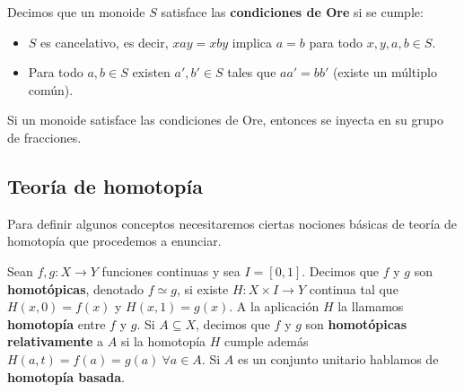 \documentclass[bibtex, anon]{TEMat-article}
\begin{document}
\begin{definicion}\label{condiciones}
	Decimos que un monoide $S$ satisface las \textbf{condiciones de Ore} \cite{Ore} si se cumple:
	\begin{itemize}
		\item $S$ es cancelativo, es decir, $xay=xby$ implica $a=b$ para todo $x,y,a,b\in S$. 
		\item Para todo $a,b\in S$ existen $a',b'\in S$ tales que $aa'=bb'$ (existe un múltiplo común). 
	\end{itemize}
\end{definicion}

\begin{prop}\cite[Teorema 1.23]{Clifford}
	Si un monoide satisface las condiciones de Ore, entonces se inyecta en su grupo de fracciones.
\end{prop}

\subsection{Teoría de homotopía}


Para definir algunos conceptos necesitaremos ciertas nociones básicas de teoría de homotopía que procedemos a enunciar.

\begin{definicion} Sean $f,g:X\to Y$ funciones continuas y sea $I=[0,1]$. Decimos que $f$ y $g$ son \textbf{homotópicas}, denotado $f\simeq g$, si existe $H:X\times I\to Y$ continua tal que $H(x,0)=f(x)$ y $H(x,1)=g(x)$. A la aplicación $H$ la llamamos \textbf{homotopía} entre $f$ y $g$. %
		Si $A\subseteq X$, decimos que $f$ y $g$ son \textbf{homotópicas relativamente} a $A$ si la homotopía $H$ cumple además $H(a,t)=f(a)=g(a)\ \forall a\in A$. Si $A$ es un conjunto unitario hablamos de \textbf{homotopía basada}. %
\end{definicion}
\end{document}
